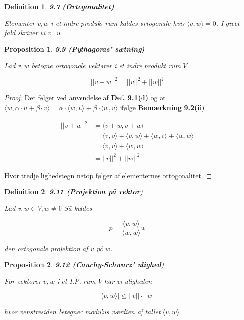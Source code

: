 \documentclass[paper=a4, fontsize=11pt]{scrartcl} %
\newtheorem*{definition}{Definition}
\newtheorem*{proposition}{Proposition}
\newenvironment{cstmproposition}[1]{\begin{proposition} {\normalfont\textbf{#1}}}{\end{proposition}}
\newenvironment{cstmdefinition}[1]{\begin{definition} {\normalfont\textbf{#1}}}{\end{definition}}
\begin{document}
	
	\begin{cstmdefinition}{9.7 (Ortogonalitet)}
		
		Elementer $v,w$ i et indre produkt rum kaldes ortogonale hvis $\langle v,w \rangle = 0$. I givet fald skriver vi $v \bot w$ 
		
	\end{cstmdefinition}
	
	
	\begin{cstmproposition}{9.9 (Pythagoras' sætning)}
		
		Lad $v,w$ betegne ortogonale vektorer i et indre produkt rum $V$
		
		\[||v + w||^2 = ||v||^2 + ||w||^2\]
		
	\end{cstmproposition}
	
	
	\begin{proof}
		Det følger ved anvendelse af \textbf{Def. 9.1(d)} og at $\langle w , \alpha \cdot u + \beta \cdot v \rangle = \overline{\alpha} \cdot \langle w , u \rangle + \overline{\beta} \cdot \langle w,v \rangle$ ifølge \textbf{Bemærkning 9.2(ii)}
		
		\begin{align*}
			||v + w||^2 &= \langle v + w , v + w \rangle\\
			&= \langle v,v \rangle + \langle v , w \rangle + \langle w , v \rangle + \langle w,w \rangle\\
			&= \langle v,v \rangle + \langle w,w \rangle \\
			&= ||v||^2 + ||w||^2
		\end{align*}
		
		Hvor tredje lighedstegn netop følger af elementernes ortogonalitet.
		
	\end{proof}
	
	\begin{cstmdefinition}{9.11 (Projektion på vektor)}
		
		Lad $v,w \in V , w \not = 0$ Så kaldes 
		
		\[p = \frac{\langle v,w \rangle}{\langle w,w \rangle} w\]
		
		den ortogonale projektion af $v$ på $w$.
		
	\end{cstmdefinition}
	
	\begin{cstmproposition}{9.12 (Cauchy-Schwarz' ulighed)}
		
		For vektorer $v,w$ i et I.P.-rum $V$ har vi uligheden 
		
		\[|\langle v,w \rangle | \leq ||v|| \cdot ||w||\]
		
		hvor venstresiden betegner modulus værdien af tallet $\langle v,w \rangle$
		
	\end{cstmproposition}
	
\end{document}
